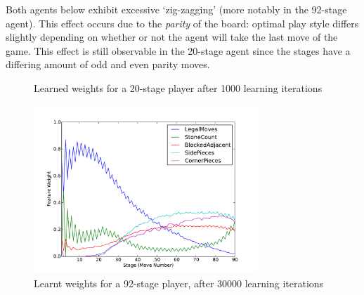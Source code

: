 \documentclass[11pt]{article}
\begin{document}
Both agents below exhibit excessive `zig-zagging' (more notably in the
92-stage agent). This effect occurs due to the \emph{parity} of the board:
optimal play style differs slightly depending on whether or not the
agent will take the last move of the game. This effect is still observable in
the 20-stage agent since the stages have a differing amount of odd and even
parity moves.

\begin{figure}[htbp]
  \centering
  \caption{Learned weights for a 20-stage player after 1000 learning
    iterations}
  \label{WeightsOverTime}
\end{figure}

\begin{figure}[htbp]
  \centering
  \includegraphics[trim=0cm 0cm 1.5cm 1cm, clip, width=0.75\textwidth]
    {../Graphs/finalweights.pdf}
  \caption{Learnt weights for a 92-stage player, after 30000 learning iterations}
  \label{WeightsOverTime92}
\end{figure}
\end{document}
